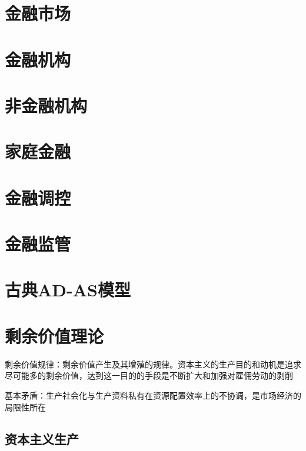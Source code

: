 \documentclass[12pt]{book}
\begin{document}
\chapter{金融市场}




\chapter{金融机构}




\chapter{非金融机构}




\chapter{家庭金融}




\chapter{金融调控}




\chapter{金融监管}









\chapter{古典AD-AS模型}\label{chapter:古典AD-AS模型}


\chapter{剩余价值理论}




剩余价值规律：剩余价值产生及其增殖的规律。资本主义的生产目的和动机是追求尽可能多的剩余价值，达到这一目的的手段是不断扩大和加强对雇佣劳动的剥削

基本矛盾：生产社会化与生产资料私有在资源配置效率上的不协调，是市场经济的局限性所在




\section{资本主义生产}
\end{document}
